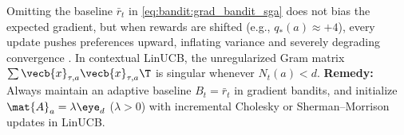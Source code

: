 \documentclass[../../../../master.tex]{subfiles}
\begin{document}
\begin{pitfall}
Omitting the baseline $\bar{r}_t$ in \eqref{eq:bandit:grad_bandit_sga} does not bias the expected gradient, but when rewards are shifted (e.g., $q_*(a) \approx +4$), every update pushes preferences upward, inflating variance and severely degrading convergence . In contextual LinUCB, the unregularized Gram matrix $\sum \vecb{x}_{\tau,a}\vecb{x}_{\tau,a}\T$ is singular whenever $N_t(a) < d$. \textbf{Remedy:} Always maintain an adaptive baseline $B_t = \bar{r}_t$ in gradient bandits, and initialize $\mat{A}_a = \lambda \eye_d$ ($\lambda > 0$) with incremental Cholesky or Sherman--Morrison updates in LinUCB.
\end{pitfall}
\end{document}
